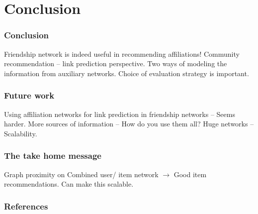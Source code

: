 \documentclass{beamer}
\begin{document}
\section{Conclusion}
\begin{frame}
\frametitle{Conclusion}
\begin{itemize}
\pitem Friendship network is indeed useful in recommending affiliations!
\pitem Community recommendation -- link prediction perspective.
\pitem Two ways of modeling the information from auxiliary networks.
\pitem Choice of evaluation strategy is important.
\end{itemize}
\end{frame}

\begin{frame}
\frametitle{Future work}
\begin{itemize}
\pitem Using affiliation networks for link prediction in friendship networks -- Seems harder.
\pitem More sources of information -- How do you use them all?
\pitem Huge networks -- Scalability.
\end{itemize}
\end{frame}

\begin{frame}
\frametitle{The take home message}
\begin{itemize}
\pitem Graph proximity on Combined user/ item network $\to$ Good item recommendations.
\pitem Can make this scalable.
\end{itemize}
\end{frame}

\begin{frame}
\frametitle{References}
\nocite{vasukiNatarajan, vasukiScalableAffiliationRec}
\end{frame}



\end{document}
